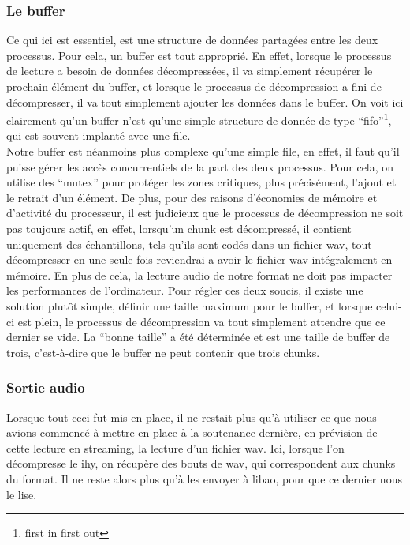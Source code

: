 \documentclass[a4paper,12pt]{article}
\begin{document}
		\subsubsection{Le buffer}
Ce qui ici est essentiel, est une structure de données partagées entre les
deux processus. Pour cela, un buffer est
tout approprié. En effet, lorsque le processus de lecture a besoin de données
décompressées, il va simplement récupérer le prochain élément du buffer, et
lorsque le processus de décompression a fini de décompresser, il va tout
simplement ajouter les données dans le buffer. On voit ici clairement qu'un
buffer n'est qu'une simple structure de donnée de type ``fifo''\footnote{first
in first out}, qui est souvent implanté avec une file.\\
Notre buffer est néanmoins plus complexe qu'une simple file, en effet, il faut
qu'il puisse gérer les accès concurrentiels de la part des deux processus. Pour
cela, on utilise des ``mutex'' pour protéger les zones critiques, plus
précisément, l'ajout et le retrait d'un élément. De plus, pour des raisons
d'économies de mémoire et d'activité du processeur, il est judicieux que le
processus de décompression ne
soit pas toujours actif, en effet, lorsqu'un chunk est décompressé, il contient
uniquement des échantillons, tels qu'ils sont codés dans un fichier wav, tout
décompresser en une seule fois reviendrai a avoir le fichier wav intégralement
en mémoire. En plus de cela, la lecture audio de notre format ne doit pas
impacter les performances de l'ordinateur. Pour régler ces deux soucis, il
existe une solution plutôt simple, définir une taille maximum pour le buffer, et
lorsque celui-ci est plein, le processus de décompression va tout simplement
attendre que ce dernier se vide. La ``bonne taille'' a été déterminée et est une
taille de buffer de trois, c'est-à-dire que le buffer ne peut contenir que
trois chunks.\\
		\subsubsection{Sortie audio}
Lorsque tout ceci fut mis en place, il ne restait plus qu'à utiliser ce que nous
avions commencé à mettre en place à la soutenance dernière, en prévision de
cette lecture en streaming, la lecture d'un fichier wav. Ici, lorsque l'on
décompresse le ihy, on récupère des bouts de wav, qui correspondent aux chunks
du format. Il ne reste alors plus qu'à les envoyer à libao, pour que ce dernier
nous le lise.
\end{document}
